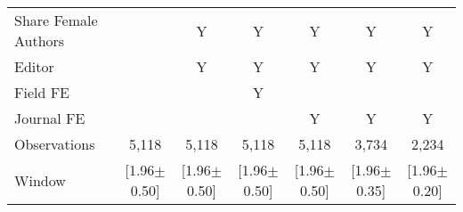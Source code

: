 \begin{tabular}{l*{6}{c}}
Share Female Authors &         &        Y&        Y&        Y&        Y&        Y\\
Editor          &         &        Y&        Y&        Y&        Y&        Y\\
Field FE        &         &         &        Y&         &         &         \\
Journal FE      &         &         &         &        Y&        Y&        Y\\
\hline
Observations    &    5,118&    5,118&    5,118&    5,118&    3,734&    2,234\\
Window          &[1.96$\pm$0.50]&[1.96$\pm$0.50]&[1.96$\pm$0.50]&[1.96$\pm$0.50]&[1.96$\pm$0.35]&[1.96$\pm$0.20]\\
\hline\hline
\end{tabular}
